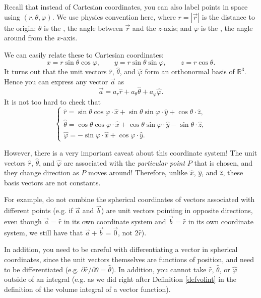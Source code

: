 Recall that instead of Cartesian coordinates, you can also label points in space using  $(r,\theta,\varphi)$. We use physics convention here, where $r=|\vec{r}|$ is the distance to the origin; $\theta$ is the , the angle between $\vec{r}$ and the $z$-axis; and $\varphi$ is the , the angle around from the $x$-axis. 

We can easily relate these to Cartesian coordinates:
\[x=r\sin\theta\cos\varphi, \qquad y=r\sin\theta\sin\varphi, \qquad z=r\cos\theta.\]
It turns out that the unit vectors $\hat{r}$, $\hat{\theta}$, and $\hat{\varphi}$ form an orthonormal basis of $\mathbb{R}^3$. Hence you can express any vector $\vec{a}$ as
\[\vec{a}=a_r\hat{r}+a_\theta\hat{\theta}+a_\varphi\hat{\varphi}.\]
It is not too hard to check that
\[
\begin{cases}
\hat{r}=\sin\theta\cos\varphi\cdot \hat{x}+\sin\theta\sin\varphi\cdot\hat{y}+\cos\theta\cdot\hat{z},\\
\hat{\theta}=\cos\theta\cos\varphi\cdot\hat{x}+\cos\theta\sin\varphi\cdot\hat{y}-\sin\theta\cdot\hat{z},\\
\hat{\varphi}=-\sin\varphi\cdot\hat{x}+\cos\varphi\cdot\hat{y}.
\end{cases}
\]

However, there is a very important caveat about this coordinate system! The unit vectors $\hat{r}$, $\hat{\theta}$, and $\hat{\varphi}$ are associated with the \textit{particular point} $P$ that is chosen, and they change direction as $P$ moves around! Therefore, unlike $\hat{x}$, $\hat{y}$, and $\hat{z}$, these basis vectors are not constants. 

For example, do not combine the spherical coordinates of vectors associated with different points (e.g. if $\vec{a}$ and $\vec{b}$) are unit vectors pointing in opposite directions, even though $\vec{a}=\hat{r}$ in its own coordinate system and $\vec{b}=\hat{r}$ in its own coordinate system, we still have that $\vec{a}+\vec{b}=\vec{0}$, not $2\hat{r}$). 

In addition, you need to be careful with differentiating a vector in spherical coordinates, since the unit vectors themselves are functions of position, and need to be differentiated (e.g. $\partial \hat{r}/\partial \theta=\hat{\theta}$).  In addition, you cannot take $\hat{r}$, $\hat{\theta}$, or $\hat{\varphi}$ outside of an integral (e.g. as we did right after Definition \ref{defvolint} in the definition of the volume integral of a vector function).

